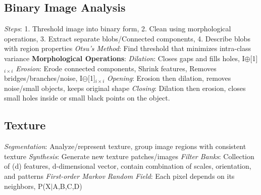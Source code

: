 \documentclass{article}
\begin{document}
\begin{multicols*}{2}
        \subsection*{Binary Image Analysis}
        \textit{Steps}: 1. Threshold image into binary form, 2. Clean using morphological operations, 3. Extract
        separate blobs/Connected components, 4. Describe blobs with region properties\newline
        \textit{Otsu's Method}: Find threshold that minimizes intra-class variance\newline
        \textbf{Morphological Operations}:\newline
        \textit{Dilation}: Closes gaps and fills holes, I$\oplus$[1]$_{i\times i}$\newline
        \textit{Erosion}: Erode connected components, Shrink features, Removes bridges/branches/noise, I$\ominus$[1]$_{i\times i}$\newline
        \textit{Opening}: Erosion then dilation, removes noise/small objects, keeps original shape\newline
        \textit{Closing}: Dilation then erosion, closes small holes inside or small black points on the object.\newline
        \subsection*{Texture}
        \textit{Segmentation}: Analyze/represent texture, group image regions with consistent texture\newline
        \textit{Synthesis}: Generate new texture patches/images\newline
        \textit{Filter Banks}: Collection of (d) features, d-dimensional vector, contain combination of scales,
        orientation, and patterns\newline
        \textit{First-order Markov Random Field}: Each pixel depends on its neighbors, P(X$\mid$A,B,C,D)\newline
    \end{multicols*}
\end{document}

